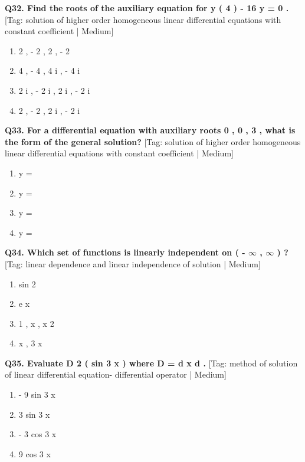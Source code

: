 \noindent\textbf{Q32. Find the roots of the auxiliary equation for y ( 4 ) - 16 y = 0 .} \hfill [Tag: solution of higher order homogeneous linear differential equations with constant coefficient | Medium]
\begin{enumerate}[label=(\alph*),topsep=2pt,itemsep=1pt,partopsep=0pt,parsep=0pt]
    \item {{2 , - 2 , 2 , - 2}}
    \item {{4 , - 4 , 4 i , - 4 i}}
    \item {{2 i , - 2 i , 2 i , - 2 i}}
    \item {{2 , - 2 , 2 i , - 2 i}}
\end{enumerate}
\vspace{2mm}

\noindent\textbf{Q33. For a differential equation with auxiliary roots 0 , 0 , 3 , what is the form of the general solution?} \hfill [Tag: solution of higher order homogeneous linear differential equations with constant coefficient | Medium]
\begin{enumerate}[label=(\alph*),topsep=2pt,itemsep=1pt,partopsep=0pt,parsep=0pt]
    \item {{y =}}
    \item {{y =}}
    \item {{y =}}
    \item {{y =}}
\end{enumerate}
\vspace{2mm}

\noindent\textbf{Q34. Which set of functions is linearly independent on ( - $\infty$ , $\infty$ ) ?} \hfill [Tag: linear dependence and linear independence of solution | Medium]
\begin{enumerate}[label=(\alph*),topsep=2pt,itemsep=1pt,partopsep=0pt,parsep=0pt]
    \item {{ sin 2}}
    \item {{ e x}}
    \item {{ 1 , x , x 2}}
    \item {{ x , 3 x }}
\end{enumerate}
\vspace{2mm}

\noindent\textbf{Q35. Evaluate D 2 ( sin 3 x ) where D = d x d .} \hfill [Tag: method of solution of linear differential equation- differential operator | Medium]
\begin{enumerate}[label=(\alph*),topsep=2pt,itemsep=1pt,partopsep=0pt,parsep=0pt]
    \item {{- 9 sin 3 x}}
    \item {{3 sin 3 x}}
    \item {{- 3 cos 3 x}}
    \item {{9 cos 3 x}}
\end{enumerate}
\vspace{2mm}

